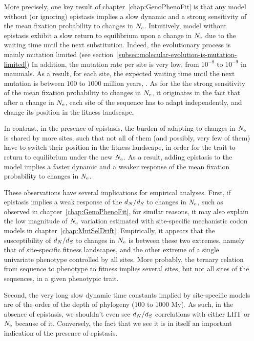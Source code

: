 More precisely, one key result of chapter~\ref{chap:GenoPhenoFit} is that any model without (or ignoring) epistasis implies a slow dynamic and a strong sensitivity of the mean fixation probability to changes in $N_{\text{e}}$.
Intuitively, model without epistasis exhibit a slow return to equilibrium upon a change in $N_{\text{e}}$ due to the waiting time until the next substitution.
Indeed, the evolutionary process is mainly mutation limited (see section~\ref{subsec:molecular-evolution-is-mutation-limited})
In addition, the mutation rate per site is very low, from $10^{-8}$ to $10^{-9}$ in mammals.
As a result, for each site, the expected waiting time until the next mutation is between $100$ to $1000$ million years, .
As for the the strong sensitivity of the mean fixation probability to changes in $N_{\text{e}}$, it originates in the fact that after a change in $N_{\text{e}}$, each site of the sequence has to adapt independently, and change its position in the fitness landscape.

In contrast, in the presence of epistasis, the burden of adapting to changes in $N_{\text{e}}$ is shared by more sites, such that not all of them (and possibly, very few of them) have to switch their position in the fitness landscape, in order for the trait to return to equilibrium under the new $N_{\text{e}}$.
As a result, adding epistasis to the model implies a faster dynamic and a weaker response of the mean fixation probability to changes in $N_{\text{e}}$.

These observations have several implications for empirical analyses.
First, if epistasis implies a weak response of the $d_N / d_S$ to changes in $N_{\text{e}}$, such as observed in chapter~\ref{chap:GenoPhenoFit}, for similar reasons, it may also explain the low magnitude of $N_{\text{e}}$ variation estimated with site-specific mechanistic codon models in chapter~\ref{chap:MutSelDrift}.
Empirically, it appears that the susceptibility of $d_N / d_S$ to changes in $N_{\text{e}}$ is between these two extremes, namely that of site-specific fitness landscapes, and the other extreme of a single univariate phenotype controlled by all sites.
More probably, the ternary relation from sequence to phenotype to fitness implies several sites, but not all sites of the sequences, in a given phenotypic trait.

Second, the very long slow dynamic time constants implied by site-specific models are of the order of the depth of phylogeny ($100$ to $1000$ My).
As such, in the absence of epistasis, we shouldn't even see $d_N / d_S$ correlations with either \acrshort{LHT} or $N_{\text{e}}$ because of it.
Conversely, the fact that we see it is in itself an important indication of the presence of epistasis.

